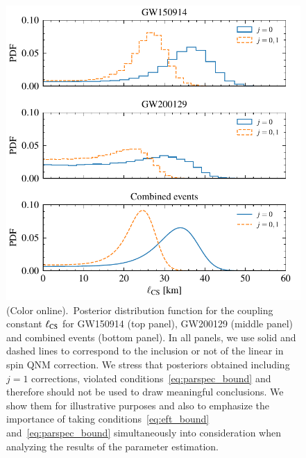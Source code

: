 \documentclass[twocolumn,
               prd,
               aps,
               superscriptaddress,
               tightenlines,
               nofootinbib,
               eqsecnum,
               amsfonts,
               amsmath,
               longbibliography]{revtex4-1}
\begin{document}
\begin{figure}[t]
\includegraphics[width=\columnwidth]{figs/dcs_posteriors_combined.pdf}
\caption{(Color online).~Posterior distribution function for the coupling constant $\ell_{\rm CS}$ for
GW150914 (top panel), GW200129 (middle panel) and combined events (bottom panel).
%
In all panels, we use solid and dashed lines to correspond to the inclusion or not of the linear
in spin QNM correction.
%
We stress that posteriors obtained including $j=1$ corrections, violated conditions~\eqref{eq:parspec_bound}
and therefore should not be used to draw meaningful conclusions. We show them for illustrative purposes
and also to emphasize the importance of taking conditions~\eqref{eq:eft_bound} and~\eqref{eq:parspec_bound}
simultaneously into consideration when analyzing the results of the parameter estimation.
}
\label{fig:dCS_exec_sum}
\end{figure}
\end{document}
